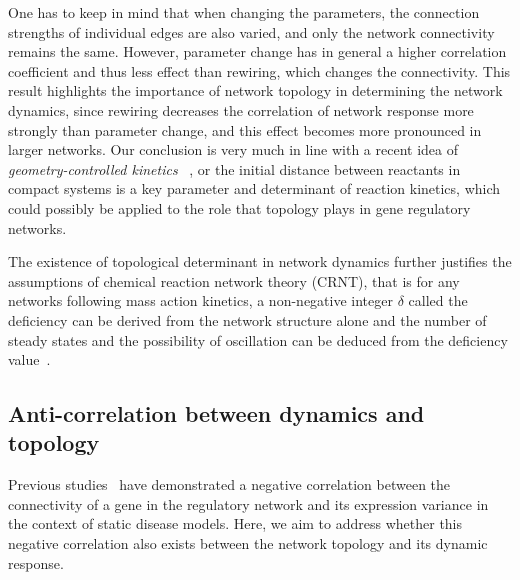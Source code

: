 One has to keep in mind that when changing the parameters,
the connection strengths of individual edges are also varied,
and only the network connectivity remains the same. However,
parameter change has in general a higher correlation coefficient
and thus less effect than rewiring, which changes the connectivity.
This result highlights the importance of network topology in
determining the network dynamics, since rewiring decreases
the correlation of network response more strongly than 
parameter change, and this effect becomes more pronounced in
larger networks. Our conclusion is very much in line with a 
recent idea of \emph{geometry-controlled kinetics}~%
\citep{Benichou2010}, or the 
initial distance between reactants in compact systems is 
a key parameter and determinant of reaction kinetics, which 
could possibly be applied to the role that topology plays 
in gene regulatory networks.

The existence of topological determinant in network dynamics
further justifies the assumptions of chemical reaction network
theory (CRNT), that is for any networks following mass action kinetics,
a non-negative integer $\delta$ called the
deficiency can be derived from the network structure
alone and the number of steady states and the possibility of 
oscillation can be deduced from the deficiency value~\citep{Conradi2005}.

\subsection{Anti-correlation between dynamics and topology}
Previous studies~\citep{Lu2007a,Mar2011} have demonstrated a negative
correlation between the connectivity of a gene in the regulatory network
and its expression variance in the context of static disease models.
Here, we aim to address whether this negative correlation also exists 
between the network topology and its dynamic response.

